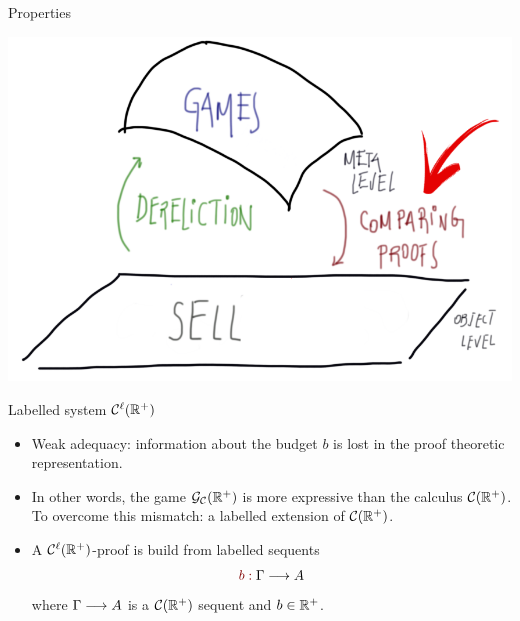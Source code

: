 \documentclass[9pt]{beamer}
\renewcommand{\emph}[1]{{\color{blue} #1}}
\newcommand{\emphdr}[1]{{\color{darkred} #1}}
\begin{document}
%

\begin{frame}{Properties}
\begin{center}
\includegraphics[scale=0.35]{../figs/LF11}
\end{center}
\end{frame}


\begin{frame}{Labelled system $\mathcal{C}^\ell(\mathbb{R}^+)$}
\begin{itemize}
\item \emph{Weak adequacy}:  information about the budget $b$ is lost in the proof theoretic representation.
\item  In other words, the game $\mathcal{G}_{\mathcal{C}}(\mathbb{R}^+)$ is more expressive than the calculus $\mathcal{C}(\mathbb{R}^+)$.
\xitem To overcome this mismatch: a  labelled extension of $\mathcal{C}(\mathbb{R}^+)$. 
\item A $\mathcal{C}^\ell(\mathbb{R}^+)$-proof is build from labelled sequents 
$$\emphdr{b:}\;\Gamma\lra A$$ 
where $\Gamma\longrightarrow A$ is a $\mathcal{C}(\mathbb{R}^+)$ sequent and $b\in\mathbb{R}^+$.
\end{itemize}
\end{frame}
\end{document}
